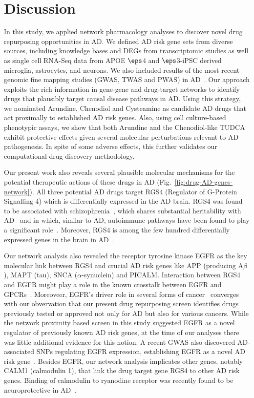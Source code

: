 \documentclass[letterpaper]{article}
\begin{document}
\section{Discussion}

In this study, we applied network pharmacology analyses to discover novel drug
repurposing opportunities in AD. We defined AD risk gene sets from diverse
sources, including knowledge bases and DEGs from transcriptomic studies as
well as single cell RNA-Seq data from APOE $\eps$4 and $\eps$3-iPSC derived
microglia, astrocytes, and neurons. We also included results of the most
recent genomic fine mapping studies (GWAS, TWAS and PWAS) in
AD~\citep{Zhu2018,Lau2020}. Our approach exploits the rich information in
gene-gene and drug-target networks to identify drugs that plausibly target
causal disease pathways in AD. Using this strategy, we nominated Arundine,
Chenodiol and Cysteamine as candidate AD drugs that act proximally to
established AD risk genes. Also, using cell culture-based phenotypic assays,
we show that both Arundine and the Chenodiol-like TUDCA exhibit protective
effects given several molecular perturbations relevant to AD pathogenesis.  In
spite of some adverse effects, this further validates our computational drug
discovery methodology.

Our present work
also reveals several plausible molecular mechanisms for the potential
therapeutic actions of these drugs in AD
(Fig.~\ref{fig:drug-AD-genes-network}).  All three potential AD drugs target
RGS4 (Regulator of G-Protein Signalling 4) which is differentially expressed
in the AD brain.  RGS4 was found to be associated
with schizophrenia~\citep{Chowdari2002}, which shares substantial
heritability with AD~\citep{Consortium2018} and in which, similar to AD,
autoimmune pathways have been found to play a significant
role~\citep{Sekar2016a}.  Moreover, RGS4 is among the few hundred
differentially expressed genes in the brain in AD
\cite{Taubes2021}.

Our network analysis also revealed the receptor tyrosine kinase EGFR as the key
molecular link between RGS4 and crucial AD risk genes like APP (producing
A$\beta$), MAPT (tau), SNCA ($\alpha$-synuclein) and PICALM.  Interaction
between RGS4 and EGFR might play a role in the known crosstalk between EGFR
and GPCRs~\cite{Wang2016c}.  Moreoveer, EGFR's driver role in several forms of
cancer~\cite{Sigismund2018} converges with our obvervation that our present
drug repurposing screen identifies drugs previously tested or
approved not only for AD but also for various cancers.  While
the network proximity based screen in this study suggested EGFR as a novel
regulator of previously known AD risk genes, at the time of our analyses there was
little additional evidence for this notion.  A recent GWAS also
discovered AD-associated SNPs regulating EGFR expression, establishing EGFR as
a novel AD risk gene~\cite{Bellenguez2022}.  Besides EGFR, our network analysis implicates
other genes, notably CALM1 (calmodulin 1), that link the drug target gene RGS4 to
other AD risk genes.  Binding of calmodulin to ryanodine receptor was recently found
to be neuroprotective in AD~\cite{Nakamura2021}.
\end{document}
